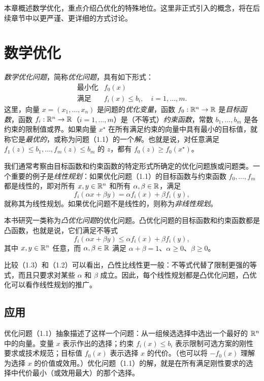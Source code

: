 本章概述数学优化，重点介绍凸优化的特殊地位。这里非正式引入的概念，将在后续章节中以更严谨、更详细的方式讨论。

\section{数学优化}
\emph{数学优化问题}，简称\emph{优化问题}，具有如下形式：
\begin{equation}
\begin{array}{ll}
\text{最小化} & f_0(x)\\
\text{满足} & f_i(x)\le b_i,\quad i=1,\ldots,m.
\end{array}\tag{1.1}
\end{equation}
这里，向量 $x=(x_1,\ldots,x_n)$ 是问题的\emph{优化变量}，函数 $f_0:\mathbb R^n\to\mathbb R$ 是\emph{目标函数}，函数 $f_i:\mathbb R^n\to\mathbb R$（$i=1,\ldots,m$）是（不等式）\emph{约束函数}，常数 $b_1,\ldots,b_m$ 是各约束的限制值或界。如果向量 $x^\star$ 在所有满足约束的向量中具有最小的目标值，就称它是\emph{最优的}，或称为问题（1.1）的一个\emph{解}。也就是说，对任意满足 $f_1(z)\le b_1,\ldots,f_m(z)\le b_m$ 的 $z$，都有 $f_0(z)\ge f_0(x^\star)$。

我们通常考察由目标函数和约束函数的特定形式所确定的优化问题族或问题类。一个重要的例子是\emph{线性规划}：如果优化问题（1.1）的目标函数与约束函数 $f_0,\ldots,f_m$ 都是线性的，即对所有 $x,y\in\mathbb R^n$ 和所有 $\alpha,\beta\in\mathbb R$，满足
\begin{equation}
 f_i(\alpha x+\beta y)=\alpha f_i(x)+\beta f_i(y),\tag{1.2}
\end{equation}
就称其为线性规划。如果优化问题不是线性的，则称为\emph{非线性规划}。

本书研究一类称为\emph{凸优化问题}的优化问题。凸优化问题的目标函数和约束函数都是凸函数，也就是说，它们满足不等式
\begin{equation}
 f_i(\alpha x+\beta y)\le\alpha f_i(x)+\beta f_i(y),\tag{1.3}
\end{equation}
其中 $x,y\in\mathbb R^n$ 任意，而 $\alpha,\beta\in\mathbb R$ 满足 $\alpha+\beta=1$、$\alpha\ge0$、$\beta\ge0$。

比较（1.3）和（1.2）可以看出，凸性比线性更一般：不等式代替了限制更强的等式，而且只要求对某些 $\alpha$ 和 $\beta$ 成立。因此，每个线性规划都是凸优化问题，凸优化可以看作线性规划的推广。

\subsection{应用}
优化问题（1.1）抽象描述了这样一个问题：从一组候选选择中选出一个最好的 $\mathbb R^n$ 中的向量。变量 $x$ 表示作出的选择；约束 $f_i(x)\le b_i$ 表示限制可选方案的刚性要求或技术规范；目标值 $f_0(x)$ 表示选择 $x$ 的代价。（也可以将 $-f_0(x)$ 理解为选择 $x$ 的价值或效用。）优化问题（1.1）的解，就是在所有满足刚性要求的选择中代价最小（或效用最大）的那个选择。

